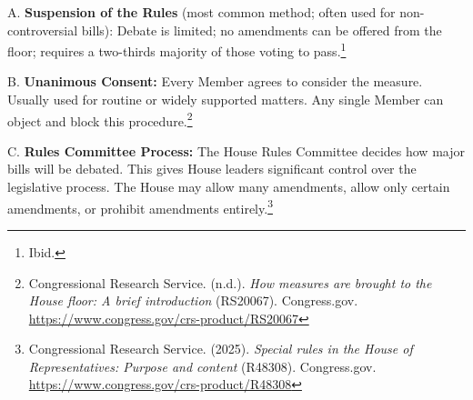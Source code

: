 A.   \textbf{Suspension of the Rules} (most common method; often used for non-controversial bills): Debate is limited; no amendments can be offered from the floor; requires a two-thirds majority of those voting to pass.\footnote{Ibid.}

B.    \textbf{Unanimous Consent:} Every Member agrees to consider the measure. Usually used for routine or widely supported matters. Any single Member can object and block this procedure.\footnote{Congressional Research Service. (n.d.). \emph{How measures are brought to the House floor: A brief introduction} (RS20067). Congress.gov. \url{https://www.congress.gov/crs-product/RS20067}}

C.    \textbf{Rules Committee Process:} The House Rules Committee decides how major bills will be debated. This gives House leaders significant control over the legislative process. The House may allow many amendments, allow only certain amendments, or prohibit amendments entirely.\footnote{Congressional Research Service. (2025). \emph{Special rules in the House of Representatives: Purpose and content} (R48308). Congress.gov. \url{https://www.congress.gov/crs-product/R48308}}

